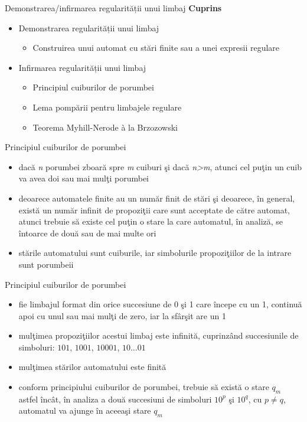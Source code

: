 \documentclass[pdf]{beamer}
\begin{document}



\begin{frame}{Demonstrarea/infirmarea regularității unui limbaj}
\textbf{Cuprins}
\begin{itemize}
\item
Demonstrarea regularității unui limbaj
\begin{itemize}
\item
Construirea unui automat cu stări finite sau a unei expresii regulare
\end{itemize}
\item
Infirmarea regularității unui limbaj
\begin{itemize}
\item
Principiul cuiburilor de porumbei
\item
Lema pompării pentru limbajele regulare
\item
Teorema Myhill-Nerode à la Brzozowski
\end{itemize}
\end{itemize}
\end{frame}



\begin{frame}{Principiul cuiburilor de porumbei}
\begin{itemize}
\item
dacă \textit{n} porumbei zboară spre \textit{m} cuiburi şi dacă \textit{n>m}, atunci cel puţin un cuib va avea doi sau mai mulţi porumbei
\item
deoarece automatele finite au un număr finit de stări şi deoarece, în general,  există un număr infinit de propoziţii care sunt acceptate de către automat, atunci trebuie să existe cel puţin o stare la care automatul, în analiză, se întoarce de două sau de mai multe ori
\item
stările automatului sunt cuiburile, iar simbolurile propoziţiilor de la intrare sunt porumbeii
\end{itemize}
\end{frame}



\begin{frame}{Principiul cuiburilor de porumbei}
\begin{itemize}
\item
fie limbajul format din orice succesiune de 0 şi 1 care începe cu un 1, continuă apoi cu unul sau mai mulţi de zero, iar la sfârşit are un 1
\item
mulţimea propoziţiilor acestui limbaj este infinită, cuprinzând succesiunile de simboluri: $ 101 $, $ 1001 $, $ 10001 $, $ 10\dots01 $
\item
mulţimea stărilor automatului este finită
\item
conform principiului cuiburilor de porumbei, trebuie să există o stare $ q_m $ astfel încât, în analiza a două succesiuni de simboluri $ 10^{p} $ şi $ 10^{q} $, cu $ p \neq q $, automatul va ajunge în aceeaşi stare $ q_m $
\end{itemize}
\end{frame}
\end{document}
